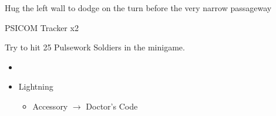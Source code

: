 \begin{multicols}{2}
Hug the left wall to dodge on the turn before the very narrow passageway

\begin{battle}{PSICOM Tracker x2}
 
\end{battle}

Try to hit 25 Pulsework Soldiers in the minigame.


\vfill

\begin{menu}
\begin{itemize}
    \paradigm
    \begin{itemize}
        \item {}%
{\paradigmline{\com}{\rav}{}}%
{\paradigmline[2]{\textit{\com}}{\textit{\syn}}{}}%
{\paradigmline{\med}{\med}{}}%
{\paradigmline{\rav}{\rav}{}}%
{\paradigmline{[\rav]}{\rav}{}}%
    \end{itemize}
    \equip
    \begin{itemize}
        \item Lightning
        \begin{itemize}
                \item Accessory $\rightarrow$ Doctor's Code
        \end{itemize}
    \end{itemize}
\end{itemize}
\end{menu}


\end{multicols}
